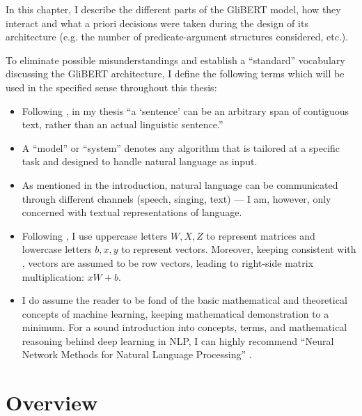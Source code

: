 
\label{chap:4_architecture}

In this chapter, I describe the different parts of the GliBERT model, how they
interact and what a priori decisions were taken during the design of its architecture
(e.g. the number of predicate-argument structures considered, etc.).

To eliminate possible misunderstandings and establish a ``standard'' vocabulary discussing the GliBERT
architecture, I define the following terms which will be used in the specified sense throughout
this thesis:

\begin{itemize}
  \item Following \cite{devlin2018bert}, in my thesis ``a `sentence' can be an arbitrary span of contiguous text, rather
    than an actual linguistic sentence.''
  \item A ``model'' or ``system'' denotes any algorithm that is tailored at a specific task and designed
    to handle natural language as input.
  \item As mentioned in the introduction, natural language can be communicated through different channels (speech, singing, text)
    --- I am, however, only concerned with textual representations of language.
  \item Following \cite{goldberg2017neural}, I use uppercase letters $W, X, Z$ to represent matrices and lowercase
    letters $b, x, y$ to represent vectors. Moreover, keeping consistent with \citeauthor{goldberg2017neural},
    vectors are assumed to be row vectors, leading to right-side matrix multiplication: $xW + b$.
  \item I do assume the reader to be fond of the basic mathematical and theoretical concepts of machine learning,
    keeping mathematical demonstration to a minimum. For a sound introduction into concepts, terms, and mathematical
    reasoning behind deep learning in NLP, I can highly recommend ``Neural Network Methods for Natural Language Processing'' \citep{goldberg2017neural}.
\end{itemize}



\section{Overview}

